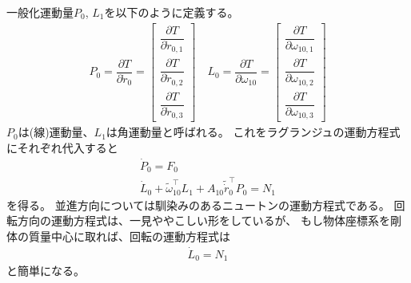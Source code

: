 \documentclass[a4j,10pt]{jsarticle}
\newcommand{\henbbn}[2]{\dfrac{\partial #1}{\partial #2}}
\begin{document}
一般化運動量$P_0$, $L_1$を以下のように定義する。
\begin{align}
    P_0 = \henbbn{T}{\dot{r}_0}
    =\begin{bmatrix}
        \henbbn{T}{\dot{r}_{0,1}}\\
        \henbbn{T}{\dot{r}_{0,2}}\\
        \henbbn{T}{\dot{r}_{0,3}}
    \end{bmatrix}
    \quad
    L_0 = \henbbn{T}{\omega_{10}}
    =\begin{bmatrix}
        \henbbn{T}{\omega_{10,1}}\\
        \henbbn{T}{\omega_{10,2}}\\
        \henbbn{T}{\omega_{10,3}}
    \end{bmatrix}
\end{align}
$P_0$は(線)運動量、$L_1$は角運動量と呼ばれる。
これをラグランジュの運動方程式にそれぞれ代入すると
\begin{align}
    \dot{P}_0 = F_0\\
    \dot{L}_0 + \tilde{\omega}_{10}^\top L_1 + A_{10}\tilde{\dot{r}}_0^\top P_0 = N_1
\end{align}
を得る。
並進方向については馴染みのあるニュートンの運動方程式である。
回転方向の運動方程式は、一見ややこしい形をしているが、
もし物体座標系を剛体の質量中心に取れば、回転の運動方程式は
\begin{align}
    \dot{L}_0 = N_1
\end{align}
と簡単になる。

\end{document}
